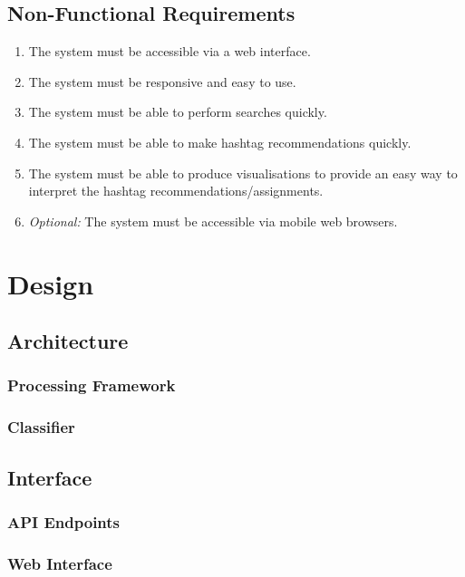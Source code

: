 \documentclass[12pt,a4paper]{article}
\begin{document}
\subsection{Non-Functional Requirements}
\begin{enumerate}
    \item \label{nfunc:web} The system must be accessible via a web interface.
    \item \label{nfunc:easy} The system must be responsive and easy to use.
    \item \label{nfunc:qsearch} The system must be able to perform searches quickly.
    \item \label{nfunc:qsuggest} The system must be able to make hashtag recommendations quickly.
    \item \label{nfunc:graphs} The system must be able to produce visualisations to provide an easy way to interpret the hashtag recommendations/assignments.
    \item \label{nfunc:mobile} \emph{Optional:} The system must be accessible via mobile web browsers.
\end{enumerate}

\pagebreak

\section{Design}
    \subsection{Architecture}
        \subsubsection{Processing Framework}
        \subsubsection{Classifier}
    \subsection{Interface}
        \subsubsection{API Endpoints}
        \subsubsection{Web Interface}
\end{document}
